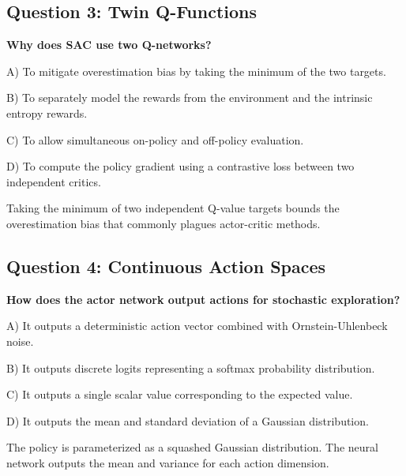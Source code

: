 \documentclass[12pt,a4paper]{article}
\theoremstyle{noteplain}
\theoremstyle{noteexercise}
\begin{document}
\subsection{Question 3: Twin Q-Functions}\label{ssec:q3}



\textbf{Why does SAC use two Q-networks?}

A) To mitigate overestimation bias by taking the minimum of the two targets.

B) To separately model the rewards from the environment and the intrinsic entropy rewards.

C) To allow simultaneous on-policy and off-policy evaluation.

D) To compute the policy gradient using a contrastive loss between two independent critics.

\begin{keypoint}[Answer: A]

Taking the minimum of two independent Q-value targets bounds the overestimation bias that commonly plagues actor-critic methods.

\end{keypoint}



\subsection{Question 4: Continuous Action Spaces}\label{ssec:q4}



\textbf{How does the actor network output actions for stochastic exploration?}

A) It outputs a deterministic action vector combined with Ornstein-Uhlenbeck noise.

B) It outputs discrete logits representing a softmax probability distribution.

C) It outputs a single scalar value corresponding to the expected value.

D) It outputs the mean and standard deviation of a Gaussian distribution.

\begin{keypoint}[Answer: D]

The policy is parameterized as a squashed Gaussian distribution. The neural network outputs the mean and variance for each action dimension.

\end{keypoint}
\end{document}
